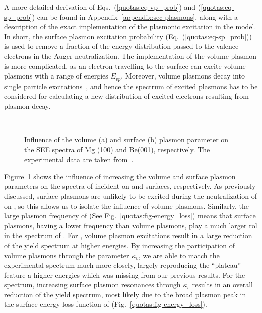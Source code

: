 \begin{refsection}
A more detailed derivation of Eqs.~(\ref{quotas:eq-vp_prob}) and 
(\ref{quotas:eq-sp_prob}) can be found in Appendix~\ref{appendix:sec-plasmons},
along with a description of the exact implementation of the plasmonic 
excitation in the model. In short, the surface plasmon excitation probability 
(Eq.~(\ref{quotas:eq-sp_prob})) is used to remove a fraction of the energy 
distribution passed to the valence electrons in the Auger neutralization. The 
implementation of the volume plasmon is more complicated, as an electron 
travelling to the surface can excite volume plasmons with a range of energies 
$E_{vp}$. Moreover, volume plasmons decay into single particle 
excitations~\cite{Maier2007}, and hence the spectrum of excited 
plasmons has to be considered for calculating a new distribution of excited 
electrons resulting from plasmon decay. 
 
\begin{figure}[ht] 
    \centering 
    \captionsetup{width=0.9\textwidth}
    \begin{subfigure}[t]{0.49\textwidth} 
        \centering 
         
        \caption{} 
    \end{subfigure}%
    ~  
    \begin{subfigure}[t]{0.49\textwidth} 
        \centering 
         
        \caption{} 
    \end{subfigure} 
\caption{Influence of the volume (a)  and surface (b) plasmon parameter on the 
SEE spectra of Mg (100) and Be(001), respectively. The experimental data are 
taken from~\cite{Baragiola2001}.} 
\label{quotas:fig-plasmon_influence} 
\end{figure} 
 
Figure~\ref{quotas:fig-plasmon_influence} shows the influence of increasing 
the volume and surface plasmon parameters on the spectra of  incident 
on  and  surfaces, respectively. As previously 
discussed, surface plasmons are unlikely to be excited during the neutralization 
of  on , so this allows us to isolate the influence of volume plasmons. 
Similarly, the large plasmon frequency of  
(See Fig.~\ref{quotas:fig-energy_loss}) means that surface plasmons, 
having a lower frequency than volume plasmons, play a much larger rol in the 
spectrum of . For , volume 
plasmon excitations result in a large reduction of the yield spectrum at 
higher energies. By increasing the participation of volume plasmons through 
the parameter $\kappa_v$, we are able to match the experimental spectrum much 
more closely, largely reproducing the ``plateau'' feature a higher energies 
which was missing from our previous results. For the  spectrum, 
increasing surface plasmon resonances through $\kappa_v$ results in an overall 
reduction of the yield spectrum, most likely due to the broad plasmon peak in 
the surface energy loss function of  (Fig.~\ref{quotas:fig-energy_loss}). 


\end{refsection}

